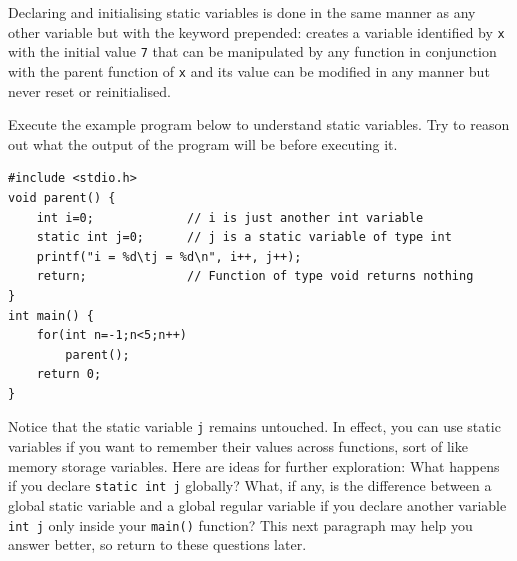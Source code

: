\documentclass[11pt,oneside]{article}
\begin{document}
{{{{{{{{{{{{Declaring and initialising static variables is done in the same manner as any other variable but with the  keyword prepended:  creates a variable identified by \verb+x+ with the initial value \verb+7+ that can be manipulated by any function in conjunction with the parent function of \verb+x+ and its value can be modified in any manner but never reset or reinitialised.

Execute the example program below to understand static variables. Try to reason out what the output of the program will be before executing it.
\begin{lstlisting}
#include <stdio.h>
void parent() {
    int i=0;             // i is just another int variable
    static int j=0;      // j is a static variable of type int
    printf("i = %d\tj = %d\n", i++, j++);
    return;              // Function of type void returns nothing
}
int main() {
    for(int n=-1;n<5;n++)
        parent();
    return 0;
}
\end{lstlisting}

Notice that the static variable \verb+j+ remains untouched. In effect, you can use static variables if you want to remember their values across functions, sort of like memory storage variables. Here are ideas for further exploration: What happens if you declare \verb+static int j+ globally? What, if any, is the difference between a global static variable and a global regular variable if you declare another variable \verb+int j+ only inside your \verb+main()+ function? This next paragraph may help you answer better, so return to these questions later.

}}}}}}}}}}}}
\end{document}
